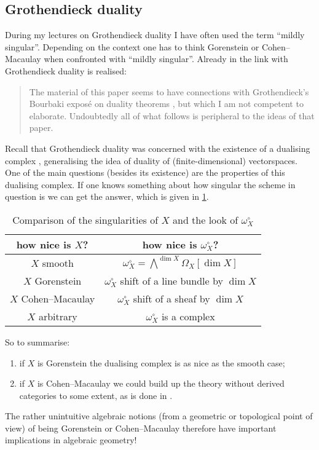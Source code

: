 \documentclass[10pt,a4paper]{article}
\begin{document}
\subsection{Grothendieck duality}
During my lectures on Grothendieck duality I have often used the term ``mildly singular''. Depending on the context one has to think Gorenstein or Cohen--Macaulay when confronted with ``mildly singular''. Already in \cite{bass-ubiquity-gorenstein-rings} the link with Grothendieck duality is realised:
\begin{quote}
  The material of this paper seems to have connections with Grothendieck's Bourbaki expos\'e on duality theorems \cite{grothendieck-theoremes-de-dualite}, but which I am not competent to elaborate. Undoubtedly all of what follows is peripheral to the ideas of that paper.
\end{quote}
Recall that Grothendieck duality was concerned with the existence of a dualising complex \cite{hartshorne-residues-and-duality}, generalising the idea of duality of (finite-dimensional) vectorspaces. One of the main questions (besides its existence) are the properties of this dualising complex. If one knows something about how singular the scheme in question is we can get the answer, which is given in \cref{table:comparison-X-dualising-sheaf}.
\begin{table}[p]
  \centering
  \begin{tabular}{cc}
    \toprule
    how nice is $X$? & how nice is $\omega_X^\circ$? \\\midrule
    $X$ smooth & $\omega_X^\circ=\bigwedge^{\dim X}\Omega_X[\dim X]$ \\
    $X$ Gorenstein & $\omega_X^\circ$ shift of a line bundle by $\dim X$ \\
    $X$ Cohen--Macaulay & $\omega_X^\circ$ shift of a sheaf by $\dim X$ \\
    $X$ arbitrary & $\omega_X^\circ$ is a complex \\
    \bottomrule
  \end{tabular}
  \caption{Comparison of the singularities of $X$ and the look of $\omega_X^\circ$}
  \label{table:comparison-X-dualising-sheaf}
\end{table}
So to summarise:
\begin{enumerate}
  \item if $X$ is Gorenstein the dualising complex is as nice as the smooth case;
  \item if $X$ is Cohen--Macaulay we could build up the theory without derived categories to some extent, as is done in \cite{hartshorne-algebraic-geometry}.
\end{enumerate}
The rather unintuitive algebraic notions (from a geometric or topological point of view) of being Gorenstein or Cohen--Macaulay therefore have important implications in algebraic geometry!
\end{document}
